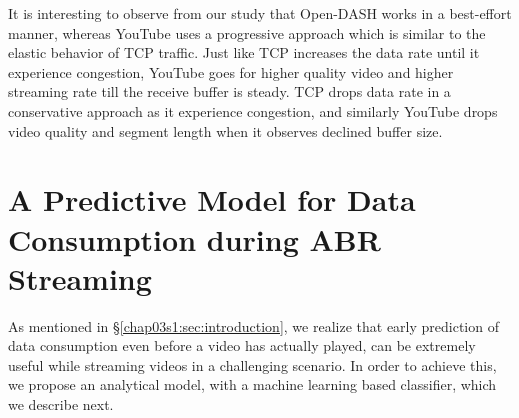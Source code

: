 It is interesting to observe from our study that Open-DASH works in a best-effort manner, whereas YouTube uses a progressive approach which is similar to the elastic behavior of TCP traffic. Just like TCP increases the data rate until it experience congestion, YouTube goes for higher quality video and higher streaming rate till the receive buffer is steady. TCP drops data rate in a conservative approach as it experience congestion, and similarly YouTube drops video quality and segment length when it observes declined buffer size.   


\section{A Predictive Model for Data Consumption during ABR Streaming}
\label{chap03s1:sec:model}

As mentioned in \S\ref{chap03s1:sec:introduction}, we realize that early prediction of data consumption even before a video has actually played, can be extremely useful while streaming videos in a challenging scenario.
In order to achieve this, we propose an analytical model, with a machine learning based classifier, which we describe next.

